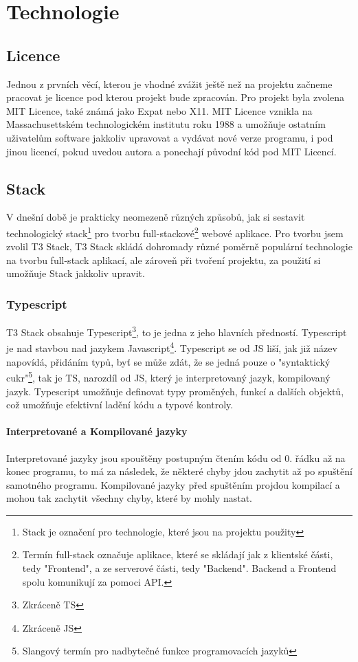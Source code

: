 \chapter{Technologie}
\section{Licence}
Jednou z prvních věcí, kterou je vhodné zvážit ještě než na projektu začneme pracovat je licence pod kterou projekt bude zpracován. Pro projekt byla zvolena MIT Licence, také známá jako Expat nebo X11\cite{GNU-Mit}. MIT Licence vznikla na Massachusettském technologickém institutu roku 1988 a umožňuje ostatním uživatelům software jakkoliv upravovat a vydávat nové verze programu, i pod jinou licencí, pokud uvedou autora a ponechají původní kód pod MIT Licencí\cite{Github-Mit}.
\section{Stack}
V dnešní době je prakticky neomezeně různých způsobů, jak si sestavit technologický stack\footnote{Stack je označení pro technologie, které jsou na projektu použity} pro tvorbu full-stackové\footnote{Termín full-stack označuje aplikace, které se skládají jak z klientské části, tedy "Frontend", a ze serverové části, tedy "Backend". Backend a Frontend spolu komunikují za pomoci API.} webové aplikace.
Pro tvorbu jsem zvolil T3 Stack, T3 Stack skládá dohromady různé poměrně populární technologie na tvorbu full-stack aplikací, ale zároveň při tvoření projektu, za použití  si umožňuje Stack jakkoliv upravit\cite{t3stack}.
\subsection{Typescript}
T3 Stack obsahuje Typescript\footnote{Zkráceně TS}, to je jedna z jeho hlavních předností. Typescript je nad stavbou nad jazykem Javascript\footnote{Zkráceně JS}. Typescript se od JS liší, jak již název napovídá, přidáním typů, byť se může zdát, že se jedná pouze o "syntaktický cukr"\footnote{Slangový termín pro nadbytečné funkce programovacích jazyků}, tak je TS, narozdíl od JS, který je interpretovaný jazyk, kompilovaný jazyk. Typescript umožňuje definovat typy proměných, funkcí a dalších objektů, což umožňuje efektivní ladění kódu a typové kontroly.

\subsubsection{Interpretované a Kompilované jazyky}
Interpretované jazyky jsou spouštěny postupným čtením kódu od 0. řádku až na konec programu, to má za následek, že některé chyby jdou zachytit až po spuštění samotného programu. Kompilované jazyky před spuštěním projdou kompilací a mohou tak zachytit všechny chyby, které by mohly nastat.

